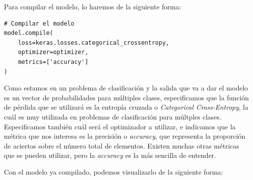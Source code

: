 \documentclass[11pt,a4paper]{article}
\begin{document}
Para compilar el modelo, lo haremos de la siguiente forma:

\begin{lstlisting}
# Compilar el modelo
model.compile(
    loss=keras.losses.categorical_crossentropy,
    optimizer=optimizer,
    metrics=['accuracy']
)
\end{lstlisting}

Como estamos en un problema de clasificación y la salida que va a dar el modelo es un vector de probabilidades para múltiples
clases, especificamos que la función de pérdida que se utilizará es la entropía cruzada o \textit{Categorical Cross-Entropy},
la cuál es muy utilizada en problemas de clasificación para múltples clases. Especificamos también cuál será el optimizador
a utilizar, e indicamos que la métrica que nos interesa es la precisión o \textit{accuracy}, que representa la proporción
de aciertos sobre el número total de elementos. Existen muchas otras métricas que se pueden utilizar, pero la \textit{accuracy}
es la más sencilla de entender.

Con el modelo ya compilado, podemos visualizarlo de la siguiente forma:
\end{document}
